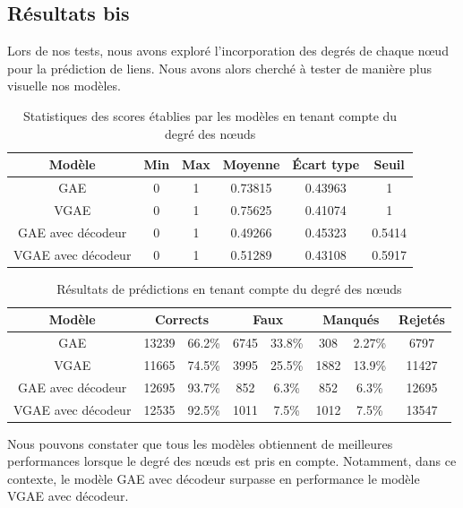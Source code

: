 \documentclass{article}
\begin{document}
\subsection{Résultats bis}
Lors de nos tests, nous avons exploré l'incorporation des degrés de chaque nœud pour la prédiction de liens. Nous avons alors cherché à tester de manière plus visuelle nos modèles.

\begin{table}[H]
    \centering
    \begin{tabular}{|c|c|c|c|c|c|}
        \hline
        Modèle & Min & Max & Moyenne & Écart type & Seuil\\
        \hline
        GAE & 0 & 1 & 0.73815 & 0.43963 & 1\\
        VGAE & 0 & 1 & 0.75625 & 0.41074 & 1\\
        GAE avec décodeur & 0 & 1 & 0.49266 & 0.45323 & 0.5414\\
        VGAE avec décodeur & 0 & 1 & 0.51289 & 0.43108 & 0.5917\\
        \hline
    \end{tabular}
    \caption{Statistiques des scores établies par les modèles en tenant compte du degré des nœuds}
    \label{tab:statistiques_scores_avec_degre}
\end{table}

\begin{table}[H]
    \centering
    \begin{tabular}{|c|c|c|c|c|c|c|c|}
        \hline
        Modèle & \multicolumn{2}{c|}{Corrects} & \multicolumn{2}{c|}{Faux} & \multicolumn{2}{c|}{Manqués} & Rejetés\\
        \hline
        GAE & 13239 & 66.2\% & 6745 & 33.8\% & 308 & 2.27\% & 6797\\
        VGAE & 11665 & 74.5\% & 3995 & 25.5\% & 1882 & 13.9\% & 11427\\
        GAE avec décodeur & 12695 & 93.7\% & 852 & 6.3\% & 852 & 6.3\% & 12695\\
        VGAE avec décodeur & 12535 & 92.5\% & 1011 & 7.5\% & 1012 & 7.5\% & 13547\\
         \hline
    \end{tabular}
    \caption{Résultats de prédictions en tenant compte du degré des nœuds}
    \label{tab:resultats_reconstruction_avec_degre}
\end{table}

Nous pouvons constater que tous les modèles obtiennent de meilleures performances lorsque le degré des nœuds est pris en compte. Notamment, dans ce contexte, le modèle GAE avec décodeur surpasse en performance le modèle VGAE avec décodeur.
\end{document}
